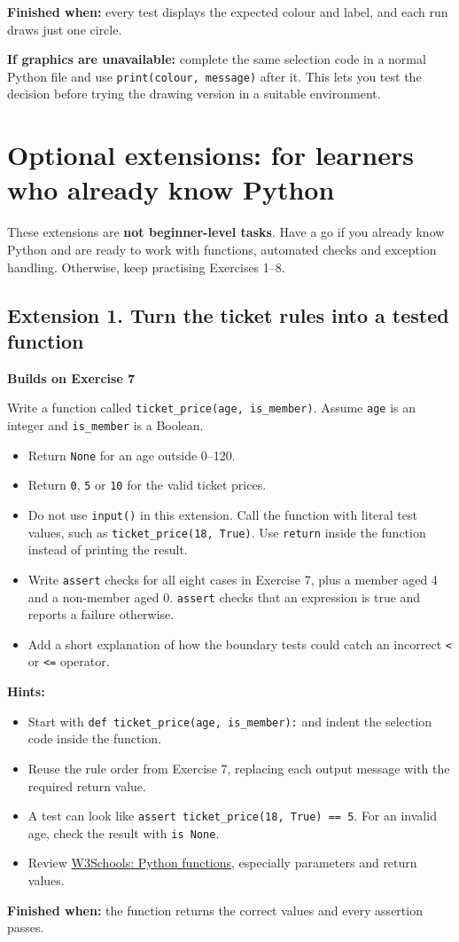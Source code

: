 \documentclass[12pt,a4paper]{article}
\begin{document}
\textbf{Finished when:} every test displays the expected colour and label, and each run draws just one circle.

\textbf{If graphics are unavailable:} complete the same selection code in a normal Python file and use \texttt{print(colour, message)} after it. This lets you test the decision before trying the drawing version in a suitable environment.

\section*{Optional extensions: for learners who already know Python}
These extensions are \textbf{not beginner-level tasks}. Have a go if you already know Python and are ready to work with functions, automated checks and exception handling. Otherwise, keep practising Exercises 1–8.

\subsection*{Extension 1. Turn the ticket rules into a tested function}
\textbf{Builds on Exercise 7}

Write a function called \texttt{ticket\_price(age, is\_member)}. Assume \texttt{age} is an integer and \texttt{is\_member} is a Boolean.

\begin{itemize}
\item Return \texttt{None} for an age outside 0–120.
\item Return \texttt{0}, \texttt{5} or \texttt{10} for the valid ticket prices.
\item Do not use \texttt{input()} in this extension. Call the function with literal test values, such as \texttt{ticket\_price(18, True)}. Use \texttt{return} inside the function instead of printing the result.
\item Write \texttt{assert} checks for all eight cases in Exercise 7, plus a member aged 4 and a non-member aged 0. \texttt{assert} checks that an expression is true and reports a failure otherwise.
\item Add a short explanation of how the boundary tests could catch an incorrect \texttt{<} or \texttt{<=} operator.
\end{itemize}
\textbf{Hints:}

\begin{itemize}
\item Start with \texttt{def ticket\_price(age, is\_member):} and indent the selection code inside the function.
\item Reuse the rule order from Exercise 7, replacing each output message with the required return value.
\item A test can look like \texttt{assert ticket\_price(18, True) == 5}. For an invalid age, check the result with \texttt{is None}.
\item Review \href{https://www.w3schools.com/python/python_functions.asp}{W3Schools: Python functions}, especially parameters and return values.
\end{itemize}
\textbf{Finished when:} the function returns the correct values and every assertion passes.
\end{document}
